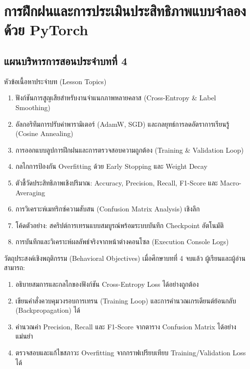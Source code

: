 \chapter{การฝึกฝนและการประเมินประสิทธิภาพแบบจำลองด้วย PyTorch}
\label{chap:pytorch_training}

\section*{แผนบริหารการสอนประจำบทที่ 4}

\begin{planbox}{หัวข้อเนื้อหาประจำบท (Lesson Topics)}
\begin{enumerate}[leftmargin=1.5em, itemsep=2pt]
    \item ฟังก์ชันการสูญเสียสำหรับงานจำแนกภาพหลายคลาส (Cross-Entropy \& Label Smoothing)
    \item อัลกอริทึมการปรับค่าพารามิเตอร์ (AdamW, SGD) และกลยุทธ์การลดอัตราการเรียนรู้ (Cosine Annealing)
    \item การออกแบบลูปการฝึกฝนและการตรวจสอบความถูกต้อง (Training \& Validation Loop)
    \item กลไกการป้องกัน Overfitting ด้วย Early Stopping และ Weight Decay
    \item ตัวชี้วัดประสิทธิภาพเชิงปริมาณ: Accuracy, Precision, Recall, F1-Score และ Macro-Averaging
    \item การวิเคราะห์เมทริกซ์ความสับสน (Confusion Matrix Analysis) เชิงลึก
    \item โค้ดตัวอย่าง: สคริปต์การเทรนแบบสมบูรณ์พร้อมระบบบันทึก Checkpoint อัตโนมัติ
    \item การบันทึกและวิเคราะห์ผลลัพธ์จริงจากหน้าต่างคอนโซล (Execution Console Logs)
\end{enumerate}
\end{planbox}

\begin{planbox}{วัตถุประสงค์เชิงพฤติกรรม (Behavioral Objectives)}
เมื่อศึกษาบทที่ 4 จบแล้ว ผู้เรียนและผู้อ่านสามารถ:
\begin{enumerate}[leftmargin=1.5em, itemsep=2pt]
    \item อธิบายสมการและกลไกของฟังก์ชัน Cross-Entropy Loss ได้อย่างถูกต้อง
    \item เขียนคำสั่งควบคุมวงรอบการเทรน (Training Loop) และการคำนวณเกรเดียนต์ย้อนกลับ (Backpropagation) ได้
    \item คำนวณค่า Precision, Recall และ F1-Score จากตาราง Confusion Matrix ได้อย่างแม่นยำ
    \item ตรวจสอบและแก้ไขสภาวะ Overfitting จากกราฟเปรียบเทียบ Training/Validation Loss ได้
\end{enumerate}
\end{planbox}

